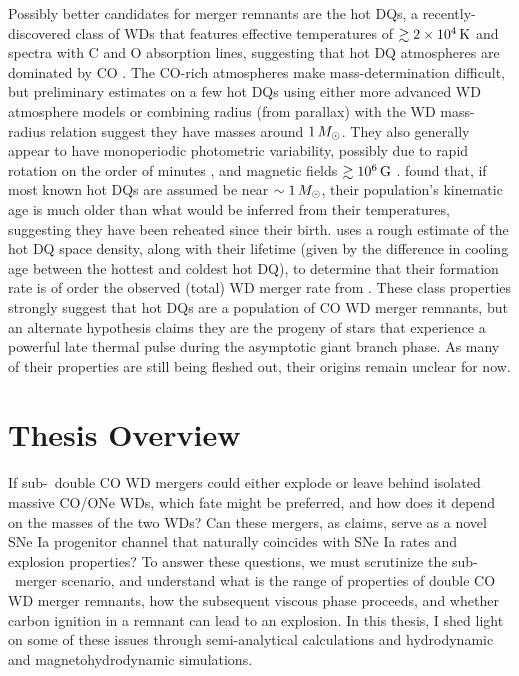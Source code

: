 Possibly better candidates for merger remnants are the hot DQs, a recently-discovered class of WDs that features effective temperatures of $\gtrsim2\times10^4\,\mathrm{K}$ and spectra with C and O absorption lines, suggesting that hot DQ atmospheres are dominated by CO \citep{dufo+07, dufo+08}.  The CO-rich atmospheres make mass-determination difficult, but preliminary estimates on a few hot DQs using either more advanced WD atmosphere models \citep{dufo+11} or combining radius (from parallax) with the WD mass-radius relation \citep{dunl15thesis} suggest they have masses around $1\,\Msun$.  They also generally appear to have monoperiodic photometric variability, possibly due to rapid rotation on the order of minutes \citep{lawr+13, will+16}, and magnetic fields $\gtrsim10^6\,\mathrm{G}$ \citep{dufo+13}.  \cite{dunlc15} found that, if most known hot DQs are assumed be near $\sim1\,\Msun$, their population's kinematic age is much older than what would be inferred from their temperatures, suggesting they have been reheated since their birth.  \cite{dunl15thesis} uses a rough estimate of the hot DQ space density, along with their lifetime (given by the difference in cooling age between the hottest and coldest hot DQ), to determine that their formation rate is of order the observed (total) WD merger rate from \cite{badem12}.  These class properties strongly suggest that hot DQs are a population of CO WD merger remnants, but an alternate hypothesis \citep{dufo+07, alth+09} claims they are the progeny of stars that experience a powerful late thermal pulse during the asymptotic giant branch phase.  As many of their properties are still being fleshed out, their origins remain unclear for now.


\section{Thesis Overview}


If sub-\Mch\ double CO WD mergers could either explode or leave behind isolated massive CO/ONe WDs, which fate might be preferred, and how does it depend on the masses of the two WDs?  Can these mergers, as \citeal{vkercj10} claims, serve as a novel SNe Ia progenitor channel that naturally coincides with SNe Ia rates and explosion properties?  To answer these questions, we must scrutinize the \citeal{vkercj10} sub-\Mch\ merger scenario, and understand what is the range of properties of double CO WD merger remnants, how the subsequent viscous phase proceeds, and whether carbon ignition in a remnant can lead to an explosion.  In this thesis, I shed light on some of these issues through semi-analytical calculations and hydrodynamic and magnetohydrodynamic simulations.

